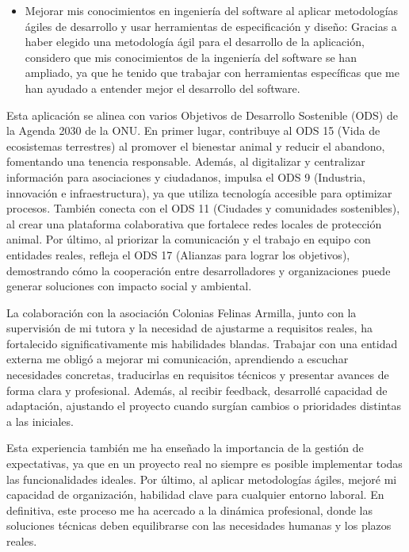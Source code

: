 \begin{itemize}
	\item Mejorar mis conocimientos en ingeniería del software al aplicar metodologías ágiles de desarrollo y usar herramientas de especificación y diseño: Gracias a haber elegido una metodología ágil para el desarrollo de la aplicación, considero que mis conocimientos de la ingeniería del software se han ampliado, ya que he tenido que trabajar con herramientas específicas que me han ayudado a entender mejor el desarrollo del software.
	\end{itemize}

  Esta aplicación se alinea con varios Objetivos de Desarrollo Sostenible (ODS) \cite{ods} de la Agenda 2030 de la ONU. En primer lugar, contribuye al ODS 15 (Vida de ecosistemas terrestres) al promover el bienestar animal y reducir el abandono, fomentando una tenencia responsable. Además, al digitalizar y centralizar información para asociaciones y ciudadanos, impulsa el ODS 9 (Industria, innovación e infraestructura), ya que utiliza tecnología accesible para optimizar procesos. También conecta con el ODS 11 (Ciudades y comunidades sostenibles), al crear una plataforma colaborativa que fortalece redes locales de protección animal. Por último, al priorizar la comunicación y el trabajo en equipo con entidades reales, refleja el ODS 17 (Alianzas para lograr los objetivos), demostrando cómo la cooperación entre desarrolladores y organizaciones puede generar soluciones con impacto social y ambiental.
  
  La colaboración con la asociación Colonias Felinas Armilla, junto con la supervisión de mi tutora y la necesidad de ajustarme a requisitos reales, ha fortalecido significativamente mis habilidades blandas. Trabajar con una entidad externa me obligó a mejorar mi comunicación, aprendiendo a escuchar necesidades concretas, traducirlas en requisitos técnicos y presentar avances de forma clara y profesional. Además, al recibir feedback, desarrollé capacidad de adaptación, ajustando el proyecto cuando surgían cambios o prioridades distintas a las iniciales.
  
  Esta experiencia también me ha enseñado la importancia de la gestión de expectativas, ya que en un proyecto real no siempre es posible implementar todas las funcionalidades ideales. Por último, al aplicar metodologías ágiles, mejoré mi capacidad de organización, habilidad clave para cualquier entorno laboral. En definitiva, este proceso me ha acercado a la dinámica profesional, donde las soluciones técnicas deben equilibrarse con las necesidades humanas y los plazos reales.
  
